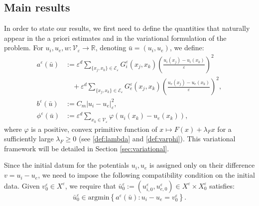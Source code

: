 \documentclass[a4paper,11pt]{article}
\theoremstyle{definition}
\numberwithin{equation}{section}
\newcommand{\e}{\varepsilon}
\newcommand{\R}{\mathbb{R}}
\newcommand{\V}{\mathcal{V}}
\begin{document}
\subsection{Main results}
In order to state our results, we first need to define the quantities that naturally appear in the a priori estimates and in the variational formulation of the problem. For $u_i,u_e,w: \V_\e \to \R$, denoting $\bar u=(u_i,u_e)$, we define:
\begin{align}
	a^\e(\bar u) 		&:= \e^d\sum_{\{x_j,x_k\}\in \mathcal{E}_\e} G_i^\e(x_j,x_k)\left(\frac{u_i(x_j)-u_i(x_k)}{\e}\right)^2 \nonumber \\
	&\quad +\e^d\sum_{\{x_j,x_k\}\in \mathcal{E}_\e} G_e^\e(x_j,x_k)\left(\frac{u_e(x_j)-u_e(x_k)}{\e}\right)^2, \label{def:ae}\\
	b^\e(\bar u) 		&:= C_m |u_i-u_e|_\e^2,\\
	\phi^\e(\bar u) 	&:= \e^d\sum_{x_k\in \V_\e} \varphi(u_i(x_k)-u_e(x_k)),
\end{align}	 
where $\varphi$ is a positive, convex primitive function of $x \mapsto F(x)+\lambda_F x$ for a sufficiently large $\lambda_F \geq 0$ (see \eqref{def:lambda} and \eqref{def:varphi}). This variational framework will be detailed in Section \ref{sec:variational}. 

Since the initial datum for the potentials $u_i,u_e$ is assigned only on their difference $v=u_i-u_e$, we need to impose the following compatibility condition on the initial data. Given $v_0^\e \in X^\e$, we require that $\bar u_0^\e:=(u_{i,0}^\e,u_{e,0}^\e)\in X^\e \times X_0^\e$ satisfies:
\begin{equation}
	\label{eq:compatibility}
	\bar u_0^\e \in \text{argmin}\left\{ a^\e(\bar u): u_i-u_e = v_0^\e\right\}. 
\end{equation}
\end{document}
